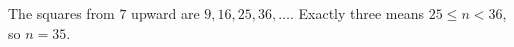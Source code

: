The squares from $7$ upward are $9,16,25,36,\dots$. Exactly three means $25\le n<36$, so $n=\boxed{35}$.

